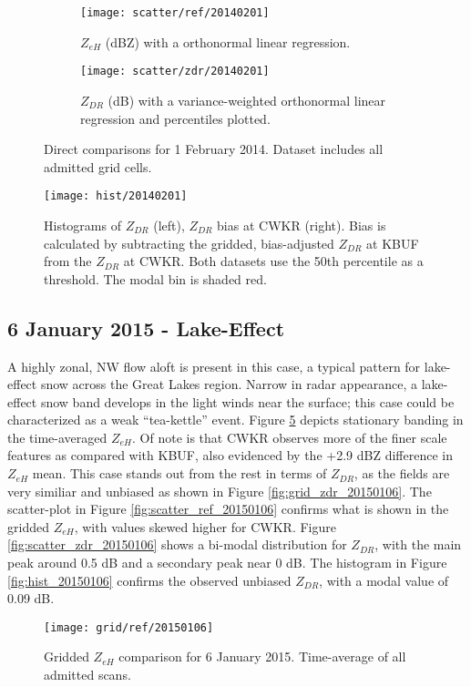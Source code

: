 \begin{figure}[H]
\centering
   \begin{subfigure}[t]{0.48\linewidth} \centering
     \texttt{[image: scatter/ref/20140201]}
     \caption{$Z_{eH}$ (dBZ) with a orthonormal linear regression.}\label{fig:scatter_ref_20140201}
   \end{subfigure}
   \begin{subfigure}[t]{0.48\linewidth} \centering
     \texttt{[image: scatter/zdr/20140201]}
     \caption{$Z_{DR}$ (dB) with a variance-weighted orthonormal linear regression and percentiles plotted.}\label{fig:scatter_zdr_20140201}
   \end{subfigure}
\caption{Direct comparisons for 1 February 2014. Dataset includes all admitted grid cells.} \label{fig:scatter_20140201}
\end{figure}

\begin{figure}[H]
\texttt{[image: hist/20140201]}\centering
\caption{Histograms of $Z_{DR}$ (left), $Z_{DR}$ bias at CWKR (right). Bias is calculated by subtracting the gridded, bias-adjusted $Z_{DR}$ at KBUF from the
$Z_{DR}$ at CWKR. Both datasets use the 50th percentile as a threshold. The modal bin is shaded red.} 
\label{fig:hist_20140201}
\end{figure}

\subsection{6 January 2015 - Lake-Effect}
A highly zonal, NW flow aloft is present in this case, a typical pattern for lake-effect snow across the Great Lakes region. Narrow in radar appearance, a
lake-effect snow band develops in the light winds near the surface; this case could be characterized as a weak ``tea-kettle'' event. Figure
\ref{fig:grid_ref_20150106} depicts stationary banding in the time-averaged $Z_{eH}$. Of note is that CWKR observes more of the finer scale features as
compared with KBUF, also evidenced by the +2.9 dBZ difference in $Z_{eH}$ mean. 
This case stands out from the rest in terms of $Z_{DR}$, as the fields are
very similiar and unbiased as shown in Figure \ref{fig:grid_zdr_20150106}. The scatter-plot in Figure
\ref{fig:scatter_ref_20150106} confirms what is shown in the gridded $Z_{eH}$, with values skewed higher for CWKR. Figure \ref{fig:scatter_zdr_20150106}
shows a bi-modal distribution for $Z_{DR}$, with the
main peak around 0.5 dB and a secondary peak near 0 dB. The histogram in Figure
\ref{fig:hist_20150106} confirms the observed unbiased $Z_{DR}$, with a modal value of 0.09 dB.
\begin{figure}[H]
\texttt{[image: grid/ref/20150106]}
\caption{Gridded $Z_{eH}$ comparison for 6 January 2015. Time-average of all admitted scans.} 
\label{fig:grid_ref_20150106}
\end{figure}

